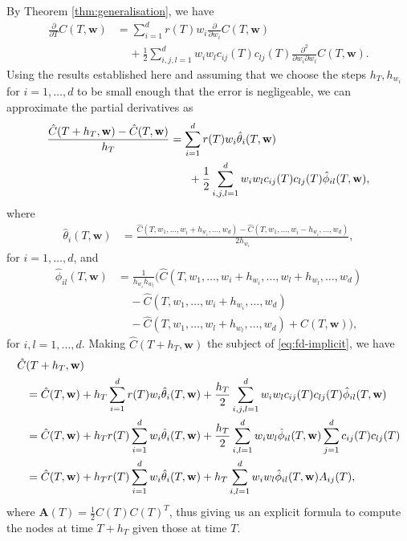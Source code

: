 \documentclass[english]{article}
\numberwithin{equation}{section}
\numberwithin{figure}{section}
\theoremstyle{bolddescit}
\theoremstyle{definition}
\theoremstyle{definition}
\theoremstyle{plain}
\theoremstyle{plain}
\theoremstyle{bolddesc}
\theoremstyle{plain}
\theoremstyle{remark}
\begin{document}
By Theorem \ref{thm:generalisation}, we have
\begin{align*}
  \frac{\partial}{\partial T} C(T,\mathbf{w})
  &= \sum_{i=1}^{d} r(T) w_i \frac{\partial}{\partial w_i} C(T,\mathbf{w})\\
  &\ \ \ \ \ + \frac{1}{2} \sum_{i,j,l=1}^{d} w_i w_l c_{ij}(T) c_{lj}(T) \frac{\partial^2}{\partial w_i \partial w_l} C(T,\mathbf{w}).
\end{align*}
Using the results established here and assuming that we choose the steps $h_T, h_{w_i}$ for $i=1,\ldots,d$ to be small enough that the error is negligeable, we can approximate the partial derivatives as
\begin{align}\label{eq:fd-implicit}
  \frac{\hat{C}(T+h_T,\mathbf{w}) - \hat{C}(T,\mathbf{w})}{h_T}
  &= \sum_{i=1}^{d} r(T) w_i \hat{\theta}_i(T,\mathbf{w})\notag\\
    &\ \ \ \ \ + \frac{1}{2} \sum_{i,j,l=1}^{d} w_i w_l c_{ij}(T) c_{lj}(T) \hat{\phi}_{il}(T,\mathbf{w}),
\end{align}
where
\begin{align*}
  \hat{\theta}_i(T,\mathbf{w})
  &= \frac{\hat{C}(T,w_1,\ldots,w_i+h_{w_i},\ldots,w_d) - \hat{C}(T,w_1,\ldots,w_i-h_{w_i},\ldots,w_d)}{2h_{w_i}},
\end{align*}
for $i=1,\ldots,d$, and
\begin{align*}
  \hat{\phi}_{il}(T,\mathbf{w})
  &= \frac{1}{h_{w_i} h_{w_l}} \Bigg( \hat{C}(T,w_1,\ldots,w_i+h_{w_i},\ldots,w_l+h_{w_l},\ldots,w_d)\\
  &\ \ \ \ \ - \hat{C}(T,w_1,\ldots,w_i+h_{w_i},\ldots,w_d)\\
  &\ \ \ \ \ - \hat{C}(T,w_1,\ldots,w_l+h_{w_l},\ldots,w_d) + \hat{C}(T,\mathbf{w}) \Bigg),
\end{align*}
for $i,l=1,\ldots,d$. Making $\hat{C}(T+h_T, \mathbf{w})$ the subject of \eqref{eq:fd-implicit}, we have
\begin{align}
  \hat{C}&(T+h_T,\mathbf{w})\notag\\
  &= \hat{C}(T,\mathbf{w}) + h_T \sum_{i=1}^{d} r(T) w_i \hat{\theta}_i(T,\mathbf{w})
     + \frac{h_T}{2} \sum_{i,j,l=1}^{d} w_i w_l c_{ij}(T) c_{lj}(T) \hat{\phi}_{il}(T,\mathbf{w})\notag\\
  &= \hat{C}(T,\mathbf{w}) + h_T r(T) \sum_{i=1}^{d} w_i \hat{\theta}_i(T,\mathbf{w}) + \frac{h_T}{2} \sum_{i,l=1}^{d} w_i w_l \hat{\phi}_{il}(T,\mathbf{w}) \sum_{j=1}^d c_{ij}(T) c_{lj}(T)\notag\\
  &= \hat{C}(T,\mathbf{w}) + h_T r(T) \sum_{i=1}^{d} w_i \hat{\theta}_i(T,\mathbf{w}) + h_T \sum_{i,l=1}^{d} w_i w_l \hat{\phi}_{il}(T,\mathbf{w}) A_{ij}(T),\label{eq:fd-chat-recur}
\end{align}
where $\mathbf{A}(T) = \frac{1}{2} C(T) C(T)^T$, thus giving us an explicit formula to compute the nodes at time $T+h_T$ given those at time $T$.
\end{document}
